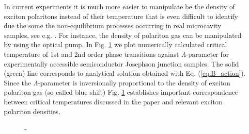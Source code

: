 \documentclass[aps, pre, preprint, groupedaddress, superscriptaddress, showkeys, showpacs] {revtex4-1}
\begin{document}
In current experiments it is much more easier to manipulate be the density of exciton polaritons instead of their temperature that is even difficult to identify due the some the non-equilibrium processes occurring in real microcavity samples, see e.g. \cite{Sanvitto,Guillet}.
For instance, the density of polariton gas can be manipulated by using the optical pump.
In Fig. \ref{pic:temperatures} we plot numerically calculated critical temperature of 1st and 2nd order phase transitions against $\Lambda$-parameter for experimentally accessible semiconductor Josephson junction samples.
The solid (green) line corresponds to analytical solution obtained with  Eq. (\ref{eq:B_action}).
Since the $\Lambda$-parameter is inversionally proportional to the density of exciton polariton gas (so-called blue shift) Fig. \ref{pic:temperatures} establishes important correspondence between critical temperatures discussed in the paper and relevant exciton polariton densities.
%
\begin{figure}[ht]
\caption{\dots}
\label{pic:temperatures}
\end{figure}
%
\end{document}
